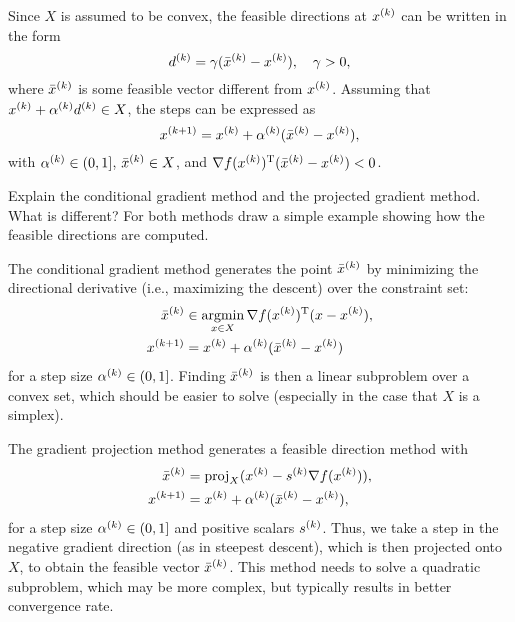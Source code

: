 \documentclass{article}
\begin{document}
Since \(X\) is assumed to be convex, the feasible directions at \(\kth{x}\) can be written in the
form
\begin{equation*}
  \kth{d} = \gamma(\kth{\bar{x}} - \kth{x}), \quad \gamma > 0,
\end{equation*}
where \(\kth{\bar{x}}\) is some feasible vector different from \(\kth{x}\).  Assuming that
\(\kth{x} + \kth{\alpha} \kth{d} \in X\), the steps can be expressed as
\begin{equation*}
  \kth[k+1]{x} = \kth{x} + \kth{\alpha}(\kth{\bar{x}} - \kth{x}),
\end{equation*}
with \(\kth{\alpha} \in (0, 1]\), \(\kth{\bar{x}} \in X\), and
\(\T{\nabla f(\kth{x})}(\kth{\bar{x}} - \kth{x}) < 0\).

\begin{question}
  Explain the conditional gradient method and the projected gradient method.  What is different? For
  both methods draw a simple example showing how the feasible directions are computed.
\end{question}

The conditional gradient method generates the point \(\kth{\bar{x}}\) by minimizing the directional
derivative (i.e., maximizing the descent) over the constraint set:
\begin{align*}
  \kth{\bar{x}} &\in \argmin_{x \in X} \T{\nabla f(\kth{x})}(x - \kth{x}), \\
  \kth[k+1]{x} &= \kth{x} + \kth{\alpha}(\kth{\bar{x}} - \kth{x})
\end{align*}
for a step size \(\kth{\alpha} \in (0, 1]\).  Finding \(\kth{\bar{x}}\) is then a linear subproblem over a convex set, which should be easier to
solve (especially in the case that \(X\) is a simplex).

The gradient projection method generates a feasible direction method with
\begin{align*}
  \kth{\bar{x}} &= \proj_X (\kth{x} - \kth{s} \nabla f(\kth{x})), \\
  \kth[k+1]{x} &= \kth{x} + \kth{\alpha}(\kth{\bar{x}} - \kth{x}),
\end{align*}
for a step size \(\kth{\alpha} \in (0, 1]\) and positive scalars \(\kth{s}\).  Thus, we take a step
in the negative gradient direction (as in steepest descent), which is then projected onto \(X\), to
obtain the feasible vector \(\kth{\bar{x}}\).  This method needs to solve a quadratic subproblem,
which may be more complex, but typically results in better convergence rate.
\end{document}
